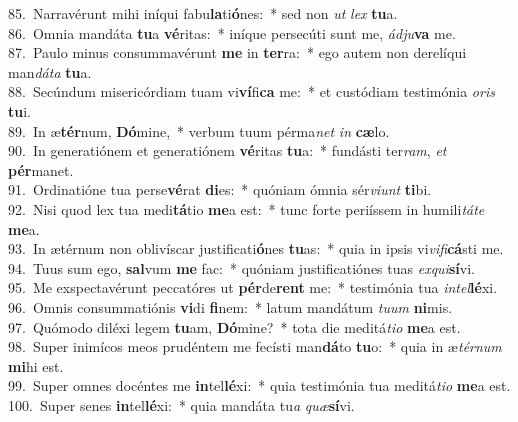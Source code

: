 {85.~}Narravérunt mihi iníqui fabu\textbf{la}ti\textbf{ó}nes:~* sed non \textit{ut} \textit{lex} \textbf{tu}a.\\
{86.~}Omnia mandáta \textbf{tu}a \textbf{vé}ritas:~* iníque persecúti sunt me, \textit{ád}\textit{ju}\textbf{va} me.\\
{87.~}Paulo minus consummavérunt \textbf{me} in \textbf{ter}ra:~* ego autem non derelíqui man\textit{dá}\textit{ta} \textbf{tu}a.\\
{88.~}Secúndum misericórdiam tuam vi\textbf{ví}fi\textbf{ca} me:~* et custódiam testimónia \textit{o}\textit{ris} \textbf{tu}i.\\
{89.~}In æ\textbf{tér}num, \textbf{Dó}mine,~* verbum tuum pérma\textit{net} \textit{in} \textbf{cæ}lo.\\
{90.~}In generatiónem et generatiónem \textbf{vé}ritas \textbf{tu}a:~* fundásti ter\textit{ram}, \textit{et} \textbf{pér}manet.\\
{91.~}Ordinatióne tua perse\textbf{vé}rat \textbf{di}es:~* quóniam ómnia sér\textit{vi}\textit{unt} \textbf{ti}bi.\\
{92.~}Nisi quod lex tua medi\textbf{tá}tio \textbf{me}a est:~* tunc forte periíssem in humili\textit{tá}\textit{te} \textbf{me}a.\\
{93.~}In ætérnum non oblivíscar justificati\textbf{ó}nes \textbf{tu}as:~* quia in ipsis vi\textit{vi}\textit{fi}\textbf{cá}sti me.\\
{94.~}Tuus sum ego, \textbf{sal}vum \textbf{me} fac:~* quóniam justificatiónes tuas \textit{ex}\textit{qui}\textbf{sí}vi.\\
{95.~}Me exspectavérunt peccatóres ut \textbf{pér}de\textbf{rent} me:~* testimónia tua \textit{in}\textit{tel}\textbf{lé}xi.\\
{96.~}Omnis consummatiónis \textbf{vi}di \textbf{fi}nem:~* latum mandátum \textit{tu}\textit{um} \textbf{ni}mis.\\
{97.~}Quómodo diléxi legem \textbf{tu}am, \textbf{Dó}mine?~* tota die meditá\textit{ti}\textit{o} \textbf{me}a est.\\
{98.~}Super inimícos meos prudéntem me fecísti man\textbf{dá}to \textbf{tu}o:~* quia in æ\textit{tér}\textit{num} \textbf{mi}hi est.\\
{99.~}Super omnes docéntes me \textbf{in}tel\textbf{lé}xi:~* quia testimónia tua meditá\textit{ti}\textit{o} \textbf{me}a est.\\
{100.~}Super senes \textbf{in}tel\textbf{lé}xi:~* quia mandáta tu\textit{a} \textit{quæ}\textbf{sí}vi.\\
